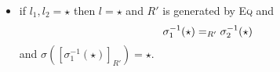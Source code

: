 \begin{definition}
\begin{itemize}
\begin{itemize}
		\[
			\inferrule
			{ l_1 \in \Im(\sigma_1) }
			{ \sigma_1^{-1}(l_1) \eq{R'} \sigma_2^{-1}(\star) }
		\]
		and $\sigma([\sigma_2^{-1}(\star)]_{R'}) = [l_1]_R$.
		\item if $l_1,l_2 = \star$ then $l=\star$ and $R'$ is generated by \textsc{Eq} and
		\[
			\sigma_1^{-1}(\star) =_{R'} \sigma_2^{-1}(\star)
		\]
		and $\sigma([\sigma_1^{-1}(\star)]_{R'}) = \star$.
	\end{itemize}
\end{itemize}
\end{definition}

